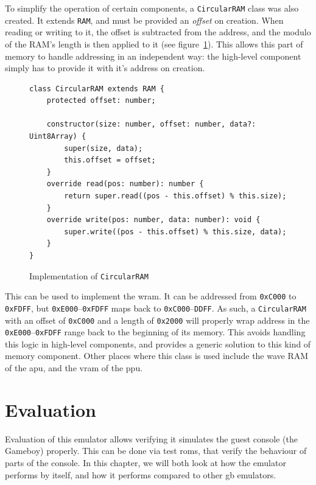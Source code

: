 \documentclass[11pt]{informatics-report}
\begin{document}
To simplify the operation of certain components, a \texttt{CircularRAM} class was also created. It extends \texttt{RAM}, and must be provided an \textit{offset} on creation. When reading or writing to it, the offset is subtracted from the address, and the modulo of the RAM's length is then applied to it (see figure~\ref{fig:circular-ram}). This allows this part of memory to handle addressing in an independent way: the high-level component simply has to provide it with it's address on creation.

\begin{figure}[h]
    \begin{verbatim}
class CircularRAM extends RAM {
    protected offset: number;

    constructor(size: number, offset: number, data?: Uint8Array) {
        super(size, data);
        this.offset = offset;
    }
    override read(pos: number): number {
        return super.read((pos - this.offset) % this.size);
    }
    override write(pos: number, data: number): void {
        super.write((pos - this.offset) % this.size, data);
    }
}
    \end{verbatim}
    \caption{Implementation of \texttt{CircularRAM}}
    \label{fig:circular-ram}
\end{figure}

This can be used to implement the \gls{wram}. It can be addressed from \texttt{0xC000} to \texttt{0xFDFF}, but \texttt{0xE000}--\texttt{0xFDFF} maps back to \texttt{0xC000}--\texttt{DDFF}. As such, a \texttt{CircularRAM} with an offset of \texttt{0xC000} and a length of \texttt{0x2000} will properly wrap address in the \texttt{0xE000}--\texttt{0xFDFF} range back to the beginning of its memory. This avoids handling this logic in high-level components, and provides a generic solution to this kind of memory component. Other places where this class is used include the wave RAM of the \gls{apu}, and the \gls{vram} of the \gls{ppu}.

\chapter{Evaluation}

Evaluation of this emulator allows verifying it simulates the guest console (the Gameboy) properly. This can be done via test \glspl{rom}, that verify the behaviour of parts of the console. In this chapter, we will both look at how the emulator performs by itself, and how it performs compared to other \gls{gb} emulators.
\end{document}
